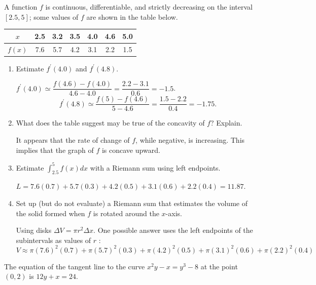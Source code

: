 \question
A function $f$ is continuous, differentiable, and strictly decreasing on the interval $[2.5,5]$; 
some values of $f$ are shown in the table below.
\begin{center}
  \begin{tabular}{c|cccccc}
  $x$ & 2.5 & 3.2 & 3.5 & 4.0 & 4.6 & 5.0 \\
  \hline
  $f(x)$ & 7.6 & 5.7 & 4.2 & 3.1 & 2.2 & 1.5 \\
  \end{tabular}
\end{center}
\begin{enumerate}
\renewcommand{\labelenumi}{(\alph{enumi})}
\item Estimate $f^{\prime}(4.0)$ and $f^{\prime}(4.8)$.
\begin{solutionorbox}[1.5in]
$f^{\prime}(4.0) \simeq \dfrac{f(4.6)-f(4.0)}{4.6-4.0}=\dfrac{2.2-3.1}{0.6}=-1.5$.
\[
f^{\prime}(4.8) \simeq \dfrac{f(5)-f(4.6)}{5-4.6}=\dfrac{1.5-2.2}{0.4}=-1.75 .
\]
\end{solutionorbox}

\item What does the table suggest may be true of the concavity of $f$? Explain.
\begin{solutionorbox}[1in]
It appears that the rate of change of $f$, while negative, is increasing. This implies that the graph of $f$ is concave upward.
\end{solutionorbox}

\item Estimate $\int_{2.5}^{5} f(x) d x$ with a Riemann sum using left endpoints.
\begin{solutionorbox}[1in]
$L=7.6(0.7)+5.7(0.3)+4.2(0.5)+3.1(0.6)+2.2(0.4)=11.87$.
\end{solutionorbox}

\item Set up (but do not evaluate) a Riemann sum that estimates the volume of the solid formed when $f$ is rotated around the $x$-axis.
\begin{solutionorbox}[1.5in]
Using disks $\Delta V=\pi r^{2} \Delta x$. One possible answer uses the left endpoints of the subintervals as values of $r$ :
\[
V \approx \pi(7.6)^{2}(0.7)+\pi(5.7)^{2}(0.3)+\pi(4.2)^{2}(0.5)+\pi(3.1)^{2}(0.6)+\pi(2.2)^{2}(0.4)
\]
\end{solutionorbox}
\end{enumerate}


\newpage

\question
The equation of the tangent line to the curve $x^{2} y-x=y^{3}-8$ at the point $(0,2)$ is $12 y+x=24$.

